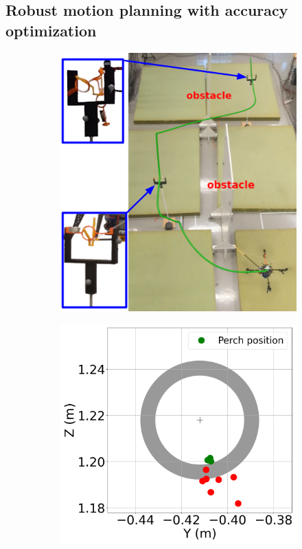 \subsection{Robust motion planning with accuracy optimization} \label{sec:AccOptExp}

\begin{figure} [htp]
    \begin{subfigure}{0.63\linewidth}
      \includegraphics[width=\linewidth]{figures/robust_accurate/ring_opti_v1.png}
    \end{subfigure}\hfill
    \begin{subfigure}{0.37\linewidth}
        \includegraphics[width=\linewidth]{figures/robust_accurate/Exp_ring_no_opti_full_zoom.png}

\end{subfigure}
\end{figure}

